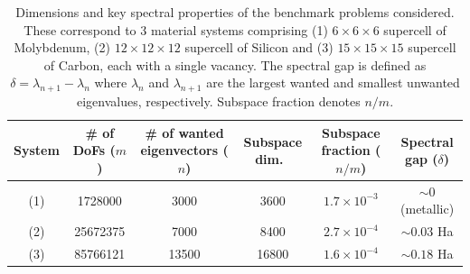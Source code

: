 \documentclass[preprint,3p,number,sort&compress]{elsarticle}
\newcommand{\cblue }{\color{black}}
\newcommand{\cn}{\color{black}}
\begin{document}
\begin{table}[htbp]
\cblue\footnotesize
\caption{Dimensions and key spectral properties of the benchmark problems considered. These correspond to 3 material systems comprising (1) $6\times 6 \times 6$ supercell of Molybdenum, (2) $12\times 12 \times 12$ supercell of Silicon and (3) $15\times 15 \times 15$ supercell of Carbon, each with a single vacancy. The spectral gap is defined as $\delta=\lambda_{n+1}-\lambda_n$ where $\lambda_n$ and $\lambda_{n+1}$ are the largest wanted and smallest unwanted eigenvalues, respectively. Subspace fraction denotes $n/m$.}\label{tab:problemSizes}
\begin{center}
 \begin{tabular}{|c|c|c|c|c|c|} \hline
 System & \# of DoFs ($m$) & \# of wanted eigenvectors ($n$) & Subspace dim.\ & Subspace fraction ($n/m$) & Spectral gap ($\delta$)\\ \hline
(1)  & 1728000&3000 &3600 & $1.7\times 10^{-3}$ & $\sim 0$ (metallic)\\
    \hline
(2) & 25672375&7000 &8400 & $2.7\times 10^{-4}$ & $\sim 0.03$ Ha\\
    \hline
 (3) & 85766121&13500 &16800 & $1.6\times 10^{-4}$ & $\sim 0.18$ Ha\\ \hline
 \end{tabular}
\end{center}
\cn\end{table}
\end{document}
